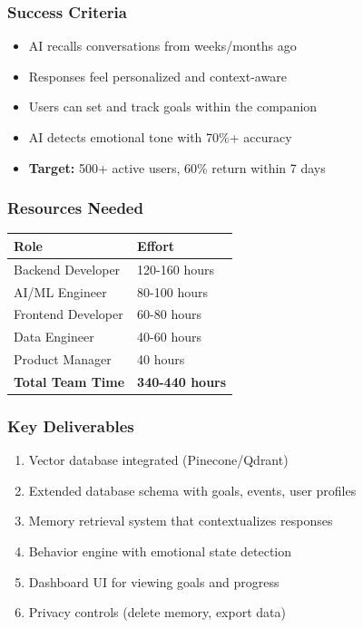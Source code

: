 \documentclass[12pt,a4paper]{article}
\begin{document}
\subsubsection{Success Criteria}

\begin{itemize}
    \item AI recalls conversations from weeks/months ago
    \item Responses feel personalized and context-aware
    \item Users can set and track goals within the companion
    \item AI detects emotional tone with 70\%+ accuracy
    \item \textbf{Target:} 500+ active users, 60\% return within 7 days
\end{itemize}

\subsubsection{Resources Needed}

\begin{table}[h]
\centering
\begin{tabular}{|l|l|}
\hline
\textbf{Role} & \textbf{Effort} \\
\hline
Backend Developer & 120-160 hours \\
\hline
AI/ML Engineer & 80-100 hours \\
\hline
Frontend Developer & 60-80 hours \\
\hline
Data Engineer & 40-60 hours \\
\hline
Product Manager & 40 hours \\
\hline
\textbf{Total Team Time} & \textbf{340-440 hours} \\
\hline
\end{tabular}
\end{table}

\subsubsection{Key Deliverables}

\begin{enumerate}
    \item Vector database integrated (Pinecone/Qdrant)
    \item Extended database schema with goals, events, user profiles
    \item Memory retrieval system that contextualizes responses
    \item Behavior engine with emotional state detection
    \item Dashboard UI for viewing goals and progress
    \item Privacy controls (delete memory, export data)
\end{enumerate}
\end{document}
